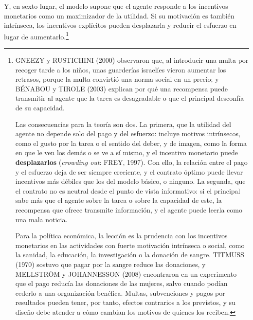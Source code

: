\documentclass[10pt,a4paper]{article}
\begin{document}
Y, en sexto lugar, el modelo supone que el agente responde a los incentivos monetarios como un maximizador de la utilidad. Si su motivación es también intrínseca, los incentivos explícitos pueden desplazarla y reducir el esfuerzo en lugar de aumentarlo.\footnote{%
    GNEEZY y RUSTICHINI (2000) observaron que, al introducir una multa por recoger tarde a los niños, unas guarderías israelíes vieron aumentar los retrasos, porque la multa convirtió una norma social en un precio; y BÉNABOU y TIROLE (2003) explican por qué una recompensa puede transmitir al agente que la tarea es desagradable o que el principal desconfía de su capacidad.

    Las consecuencias para la teoría son dos. La primera, que la utilidad del agente no depende solo del pago y del esfuerzo: incluye motivos intrínsecos, como el gusto por la tarea o el sentido del deber, y de imagen, como la forma en que le ven los demás o se ve a sí mismo, y el incentivo monetario puede \textbf{desplazarlos} (\textit{crowding out}: FREY, 1997). Con ello, la relación entre el pago y el esfuerzo deja de ser siempre creciente, y el contrato óptimo puede llevar incentivos más débiles que los del modelo básico, o ninguno. La segunda, que el contrato no es neutral desde el punto de vista informativo: si el principal sabe más que el agente sobre la tarea o sobre la capacidad de este, la recompensa que ofrece transmite información, y el agente puede leerla como una mala noticia.

    Para la política económica, la lección es la prudencia con los incentivos monetarios en las actividades con fuerte motivación intrínseca o social, como la sanidad, la educación, la investigación o la donación de sangre. TITMUSS (1970) sostuvo que pagar por la sangre reduce las donaciones, y MELLSTRÖM y JOHANNESSON (2008) encontraron en un experimento que el pago reducía las donaciones de las mujeres, salvo cuando podían cederlo a una organización benéfica. Multas, subvenciones y pagos por resultados pueden tener, por tanto, efectos contrarios a los previstos, y su diseño debe atender a cómo cambian los motivos de quienes los reciben.
}


\clearpage
\end{document}
